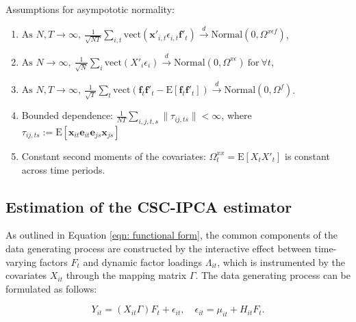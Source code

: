 \documentclass[12pt]{article}
\begin{document}
\begin{assumption}
Assumptions for asympototic normality:
\begin{enumerate}
    \item $\text{As } N, T \to \infty, \: \frac{1}{\sqrt{NT}} \sum_{i,t} \text{vect}\left( \mathbf{x}'_{i,t} \epsilon_{i,t} \mathbf{f}'_{t} \right) \xrightarrow{d} \text{Normal} \left(0, \Omega^{x\epsilon f} \right)$,
    
    \item $\text{As } N \to \infty, \: \frac{1}{\sqrt{N}} \sum_{i} \text{vect}\left( X'_{i} \epsilon_{i} \right) \xrightarrow{d} \text{Normal} \left(0, \Omega^{x\epsilon} \right) \: \text{for} \: \forall t$,
    
    \item $\text{As } N, T \to \infty, \: \frac{1}{\sqrt{T}} \sum_{t} \text{vect}\left( \mathbf{f}_{t}\mathbf{f}'_{t} - \mathrm{E}[\mathbf{f}_{t}\mathbf{f}'_{t}] \right) \xrightarrow{d} \text{Normal} \left(0, \Omega^{f} \right)$.
    
    \item Bounded dependence: $\frac{1}{NT} \sum_{i,j,t,s}\|\tau_{ij, ts}\| < \infty$, where $\tau_{ij, ts} := \mathrm{E} \left[ \mathbf{x}_{it} \mathbf{e}_{it} \mathbf{e}_{js} \mathbf{x}_{js} \right]$
    
    \item Constant second moments of the covariates: $\Omega_t^{xx} = \mathrm{E}\left[ X_{t} X'_{t} \right]$ is constant across time periods.
    \end{enumerate}
    \label{app: ass normality}
\end{assumption}

\subsection{Estimation of the CSC-IPCA estimator}
\label{sec: appendix estimation}

As outlined in Equation \ref{eqn: functional form}, the common components of the data generating process are constructed by the interactive effect between time-varying factors $F_t$ and dynamic factor loadings $\Lambda_{it}$, which is instrumented by the covariates $X_{it}$ through the mapping matrix $\Gamma$. The data generating process can be formulated as follows:

\begin{equation}
\label{app: eqn combined}
Y_{it} = (X_{it}\Gamma) F_{t} + \epsilon_{it}, \quad \epsilon_{it} = \mu_{it} + H_{it} F_t.
\end{equation}
\end{document}
